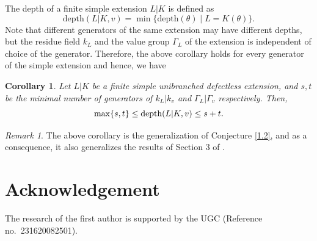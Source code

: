 \documentclass[11pt]{amsart}
\newtheorem{corollary}[theorem]{Corollary}
\theoremstyle{definition}
\theoremstyle{remark}
\newtheorem{remark}[theorem]{Remark}
\numberwithin{equation}{section}
\begin{document}
	The depth of a finite simple extension $L|K$ is defined as 
	\[\text{depth}(L|K,v)=\min\{\text{depth}(\theta)\mid L=K(\theta)\}.\] Note that different generators of the same extension may have different depths, but the residue field $k_L$ and the value group $\Gamma_L$ of the extension is independent of choice of the generator. Therefore, the above corollary holds for every generator of the simple extension and hence, we have
	
	\begin{corollary}\label{lc}
		Let $L|K$ be a finite simple unibranched defectless extension, and $s, t$ be the minimal number of generators of $k_L|k_v$ and $\Gamma_L|\Gamma_v$ respectively. Then, \[\max\{s,t\}\leq \textup{depth}(L|K,v)\leq s+t.\]
	\end{corollary}
	
	\begin{remark}
		The above corollary is the generalization of Conjecture \ref{1.2}, and as a consequence, it also generalizes the results of Section 3 of \cite{NN}.
	\end{remark}
	
	
	\section*{Acknowledgement}
	The research of the first author is supported by the UGC
	(Reference no.\ 231620082501).
	
	
\end{document}
